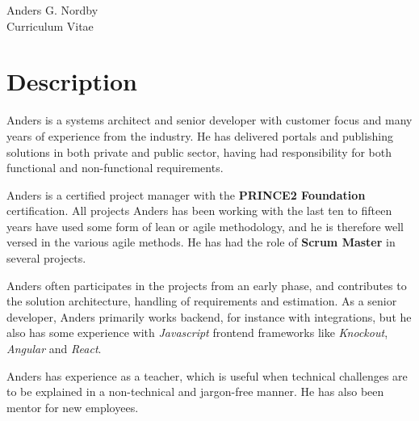 \documentclass[10pt]{article} %
\begin{document}
\begin{paracol}{2} %


\parbox[top][0.12\textheight][c]{\linewidth}{ %
	\vspace{-0.04\textheight} %
	\centering %
	{\sffamily\Huge Anders G. Nordby}\\\medskip %
	{\Huge\color{headings}\cvtextfont Curriculum Vitae}
}


\section{Description}

Anders is a systems architect and senior developer with customer focus and many years of
experience from the industry. He has delivered portals and publishing solutions in both private
and public sector, having had responsibility for both functional and non-functional requirements.
\medskip

Anders is a certified project manager with the \textbf{PRINCE2 Foundation} certification. All projects 
Anders has been working with the last ten to fifteen years have used some form of lean or agile methodology, and he
is therefore well versed in the various agile methods. He has had the role of \textbf{Scrum Master} in several projects.
\medskip

Anders often participates in the projects from an early phase, and contributes to the solution
architecture, handling of requirements and estimation. As a senior developer, 
Anders primarily works backend, for instance with integrations, but he also has some experience with 
\textit{Javascript} frontend frameworks like \textit{Knockout}, \textit{Angular} and \textit{React}.
\medskip

Anders has experience as a teacher, which is useful when technical challenges are to be explained 
in a non-technical and jargon-free manner. He has also been mentor for new employees.
\medskip


\end{paracol}
\end{document}

